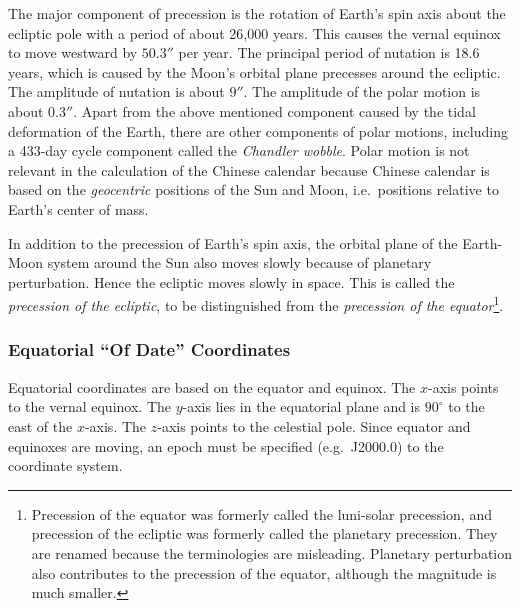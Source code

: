 \documentclass[12pt]{article}
\begin{document}
\begin{CJK}{UTF8}{bkai}
The major component of precession is the rotation of Earth's spin axis about the
ecliptic pole with a period of about 26,000 years. This causes the vernal equinox
to move westward by $50.3''$ per year. The principal period of nutation
is 18.6 years, which is caused by the Moon's orbital plane precesses around
the ecliptic. The amplitude of nutation is about $9''$. The amplitude
of the polar motion is about $0.3''$. Apart from the above mentioned component 
caused by the tidal deformation of the Earth, there are other components 
of polar motions, including a 433-day cycle component called the 
{\em Chandler wobble}. Polar motion is not relevant in the calculation of the 
Chinese calendar because
Chinese calendar is based on the {\em geocentric} positions of the Sun and Moon, i.e.\
positions relative to Earth's center of mass.

In addition to the precession of Earth's spin axis, the orbital plane
of the Earth-Moon system around the Sun also moves slowly because of planetary perturbation.
Hence the ecliptic moves slowly in space. This is called the
{\em precession of the ecliptic}, to be distinguished from
the {\em precession of the equator}\footnote{Precession of the equator was
formerly called the luni-solar precession, and precession of the ecliptic
was formerly called the planetary precession. They are renamed because the
terminologies are misleading. Planetary perturbation also contributes to
the precession of the equator, although the magnitude is much smaller.}.

\subsubsection{Equatorial ``Of Date'' Coordinates}

Equatorial coordinates are based on the equator and equinox. The $x$-axis
points to the vernal equinox. The $y$-axis lies in the equatorial plane
and is $90^\circ$ to the east of the $x$-axis. The $z$-axis points to
the celestial pole. Since equator
and equinoxes are moving, an epoch must be specified (e.g.\ J2000.0) to the coordinate
system. 


\end{CJK}
\end{document}
